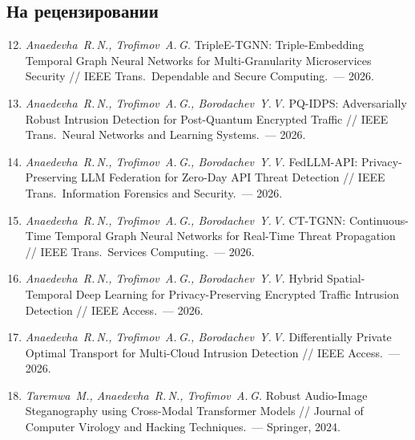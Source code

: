 \documentclass[12pt,a5paper]{article}
\begin{document}
\subsection*{На рецензировании}

\begin{enumerate}
\setcounter{enumi}{11}
\item \textit{Anaedevha~R.\,N., Trofimov~A.\,G.} TripleE-TGNN:
Triple-Embedding Temporal Graph Neural Networks for
Multi-Granularity Microservices Security // IEEE Trans.\
Dependable and Secure Computing.~--- 2026.

\item \textit{Anaedevha~R.\,N., Trofimov~A.\,G., Borodachev~Y.\,V.}
PQ-IDPS: Adversarially Robust Intrusion Detection for
Post-Quantum Encrypted Traffic // IEEE Trans.\ Neural
Networks and Learning Systems.~--- 2026.

\item \textit{Anaedevha~R.\,N., Trofimov~A.\,G., Borodachev~Y.\,V.}
FedLLM-API: Privacy-Preserving LLM Federation for Zero-Day
API Threat Detection // IEEE Trans.\ Information Forensics
and Security.~--- 2026.

\item \textit{Anaedevha~R.\,N., Trofimov~A.\,G., Borodachev~Y.\,V.}
CT-TGNN: Continuous-Time Temporal Graph Neural Networks
for Real-Time Threat Propagation // IEEE Trans.\ Services
Computing.~--- 2026.

\item \textit{Anaedevha~R.\,N., Trofimov~A.\,G., Borodachev~Y.\,V.}
Hybrid Spatial-Temporal Deep Learning for
Privacy-Preserving Encrypted Traffic Intrusion Detection //
IEEE Access.~--- 2026.

\item \textit{Anaedevha~R.\,N., Trofimov~A.\,G., Borodachev~Y.\,V.}
Differentially Private Optimal Transport for Multi-Cloud
Intrusion Detection // IEEE Access.~--- 2026.

\item \textit{Taremwa~M., Anaedevha~R.\,N., Trofimov~A.\,G.}
Robust Audio-Image Steganography using Cross-Modal
Transformer Models // Journal of Computer Virology and
Hacking Techniques.~--- Springer, 2024.
\end{enumerate}
\end{document}
